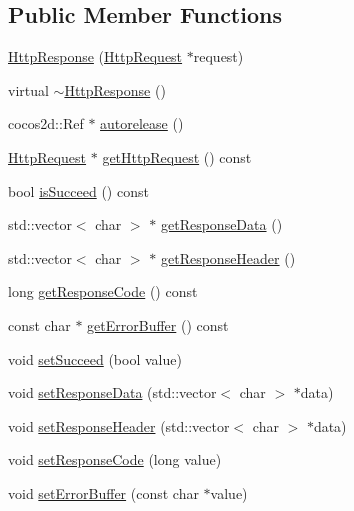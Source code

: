 \subsection*{Public Member Functions}
\begin{DoxyCompactItemize}
\item 
\hyperlink{classnetwork_1_1HttpResponse_a6d9176e90ac973214c91496bb2dee460}{Http\+Response} (\hyperlink{classnetwork_1_1HttpRequest}{Http\+Request} $\ast$request)
\item 
virtual \hyperlink{classnetwork_1_1HttpResponse_aa04ed598ec5a712beb9c2805d7da7d5e}{$\sim$\+Http\+Response} ()
\item 
cocos2d\+::\+Ref $\ast$ \hyperlink{classnetwork_1_1HttpResponse_a1b2e5c8062533484d3cbf5ca26b91f8f}{autorelease} ()
\item 
\hyperlink{classnetwork_1_1HttpRequest}{Http\+Request} $\ast$ \hyperlink{classnetwork_1_1HttpResponse_a9f5228a87f350055ae7316d6dc26e26f}{get\+Http\+Request} () const
\item 
bool \hyperlink{classnetwork_1_1HttpResponse_a3c1b4884e358688855ee21b8cd1bd0dd}{is\+Succeed} () const
\item 
std\+::vector$<$ char $>$ $\ast$ \hyperlink{classnetwork_1_1HttpResponse_a476f45e6514da88f0ce5ba462dc2235a}{get\+Response\+Data} ()
\item 
std\+::vector$<$ char $>$ $\ast$ \hyperlink{classnetwork_1_1HttpResponse_a04a9c96a83fb6282cfe1462d0e3345d6}{get\+Response\+Header} ()
\item 
long \hyperlink{classnetwork_1_1HttpResponse_aa968e433339f10f30bee2998e0c237d4}{get\+Response\+Code} () const
\item 
const char $\ast$ \hyperlink{classnetwork_1_1HttpResponse_a93f2be80baf4a6f82e7e7e0bf3399b43}{get\+Error\+Buffer} () const
\item 
void \hyperlink{classnetwork_1_1HttpResponse_ad553ec4853bd1bd0b1cecd52f541e0bb}{set\+Succeed} (bool value)
\item 
void \hyperlink{classnetwork_1_1HttpResponse_ae53dc439344a00b7af4c5ffd1d4ad3bd}{set\+Response\+Data} (std\+::vector$<$ char $>$ $\ast$data)
\item 
void \hyperlink{classnetwork_1_1HttpResponse_a31318c91d033c09d4d54aa00edf9d5fb}{set\+Response\+Header} (std\+::vector$<$ char $>$ $\ast$data)
\item 
void \hyperlink{classnetwork_1_1HttpResponse_a97dff55588b04d216edeaac03c8bf159}{set\+Response\+Code} (long value)
\item 
void \hyperlink{classnetwork_1_1HttpResponse_a45fe52ae0cb41f622a4e5e40f3b0a8ca}{set\+Error\+Buffer} (const char $\ast$value)

\end{DoxyCompactItemize}
